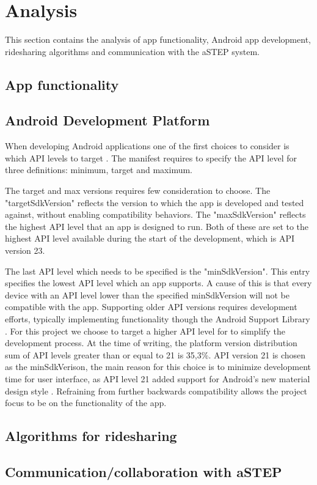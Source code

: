 \section{Analysis}
This section contains the analysis of app functionality, Android app development, ridesharing algorithms and communication with the aSTEP system.

\subsection{App functionality}




\subsection{Android Development Platform}
When developing Android applications one of the first choices to consider is which API levels to target \cite{usesSDK}.
The manifest requires to specify the API level for three definitions: minimum, target and maximum. 

The target and max versions requires few consideration to choose.
The "targetSdkVersion" reflects the version to which the app is developed and tested against, without enabling compatibility behaviors.
The "maxSdkVersion" reflects the highest API level that an app is designed to run.
Both of these are set to the highest API level available during the start of the development, which is API version 23.

The last API level which needs to be specified is the "minSdkVersion".
This entry specifies the lowest API level which an app supports.
A cause of this is that every device with an API level lower than the specified minSdkVersion will not be compatible with the app.
Supporting older API versions requires development efforts, typically implementing functionality though the Android Support Library \cite{androidSL}.
For this project we choose to target a higher API level for to simplify the development process.
At the time of writing, the platform version distribution sum of API levels greater than or equal to 21 is 35,3\%.
API version 21 is chosen as the minSdkVerison, the main reason for this choice is to minimize development time for user interface, as API level 21 added support for Android's new material design style \cite{android5API}. Refraining from further backwards compatibility allows the project focus to be on the functionality of the app. 

\subsection{Algorithms for ridesharing}


\subsection{Communication/collaboration with aSTEP}



